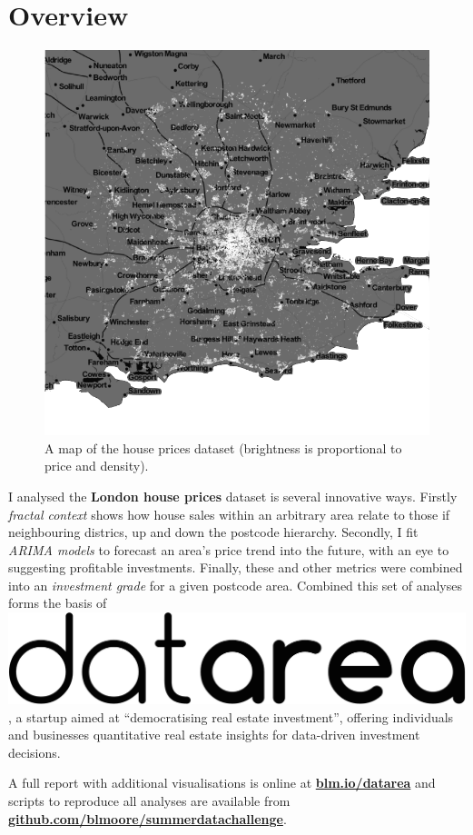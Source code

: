 \documentclass[
10pt, %
a4paper, %
oneside, %
headinclude,footinclude, %
BCOR5mm, %
]{scrartcl}
\newcommand*{\logo}{\includegraphics[scale=.04]{Figures/logotext.png}}
\begin{document}
\section*{Overview} 

\setlength{\intextsep}{0em}
\begin{figure}
\centering
\includegraphics[width=.28\textwidth]{Figures/overview.png}
\vspace{-1em}
\caption*{ A map of the house prices dataset (brightness is proportional to
  price and density).}
\end{figure}

I analysed the {\bf London house prices} dataset is several innovative
ways. Firstly \emph{fractal context} shows how house sales within an
arbitrary area relate to those if neighbouring districs, up and down
the postcode hierarchy. Secondly, I fit \emph{ARIMA models} to
forecast an area's price trend into the future, with an eye to
suggesting profitable investments. Finally, these and other metrics
were combined into an \emph{investment grade} for a given postcode
area. Combined this set of analyses forms the basis of \logo, a
startup aimed at ``democratising real estate investment'', offering
individuals and businesses quantitative real estate insights for
data-driven investment decisions.

A full report with additional visualisations is online at {\bf
  \leavevmode\href{http://blm.io/datarea}{blm.io/datarea} }and scripts to
reproduce all analyses are available from {\bf
  \leavevmode\href{http://github.com/blmoore/summerdatachallenge}{github.com/blmoore/summerdatachallenge}}.


{\let\thefootnote\relax{}}
\end{document}
